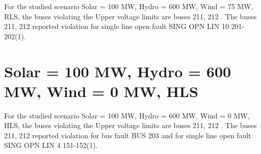 \documentclass[10pt]{report}
\begin{document}
For the studied scenario Solar = 100 MW, Hydro = 600 MW, Wind = 75 MW, RLS, the buses violating the Upper voltage limits are buses 211, 212 .
The buses 211, 212 reported violation for single line open fault SING OPN LIN   10 201-202(1).
\begin{table}[H]
\caption{Contingencies reporting bus voltages greater than emergency voltage of 1.1 PU for scenario Solar = 100 MW, Hydro = 600 MW, Wind = 75 MW, RLS}
\label{HVSolar100MWHydro600MWWind75MWRLS}
\centering
{}
\end{table}

\section{Solar = 100 MW, Hydro = 600 MW, Wind = 0 MW, HLS}

For the studied scenario Solar = 100 MW, Hydro = 600 MW, Wind = 0 MW, HLS, the buses violating the Upper voltage limits are buses 211, 212 .
The buses 211, 212 reported violation for bus fault BUS 203 and for single line open fault SING OPN LIN   4 151-152(1).
\begin{table}[H]
\caption{Contingencies reporting bus voltages greater than emergency voltage of 1.1 PU for scenario Solar = 100 MW, Hydro = 600 MW, Wind = 0 MW, HLS}
\label{HVSolar100MWHydro600MWWind0MWHLS}
\centering
{}
\end{table}
\end{document}

